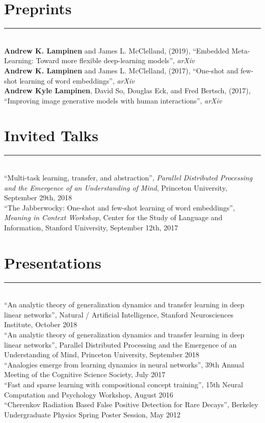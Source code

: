 \documentclass[margin]{res}
\begin{document}
\begin{resume}
\vspace{1pt}\section{Preprints} \vspace{-15pt} \rule{\textwidth}{0.5pt} \\[3pt]
\textbf{Andrew K. Lampinen} and James L. McClelland, (2019), {``Embedded Meta-Learning: Toward more flexible deep-learning models''}, \textit{arXiv} \\ [3pt] 
\textbf{Andrew K. Lampinen} and James L. McClelland, (2017), {``One-shot and few-shot learning of word embeddings''}, \textit{arXiv} \\ [3pt] 
\textbf{Andrew Kyle Lampinen}, David So, Douglas Eck, and Fred Bertsch, (2017), {``Improving image generative models with human interactions''}, \textit{arXiv} 

\vspace{1pt}\section{Invited Talks} \vspace{-15pt} \rule{\textwidth}{0.5pt} \\[3pt]
{``Multi-task learning, transfer, and abstraction''}, \textit{Parallel Distributed Processing and the Emergence of an Understanding of Mind}, Princeton University, September 29th, 2018\\[3pt] 
{``The Jabberwocky: One-shot and few-shot learning of word embeddings''}, \textit{Meaning in Context Workshop}, Center for the Study of Language and Information,  Stanford University, September 12th, 2017 
 
\vspace{1pt}\section{Presentations} \vspace{-15pt} \rule{\textwidth}{0.5pt} \\[3pt]
{``An analytic theory of generalization dynamics and transfer learning in deep linear networks''}, Natural / Artificial Intelligence, Stanford Neurosciences Institute, October 2018\\[3pt]
{``An analytic theory of generalization dynamics and transfer learning in deep linear networks''}, Parallel Distributed Processing and the Emergence of an Understanding of Mind, Princeton University, September 2018\\[3pt]
{``Analogies emerge from learning dynamics in neural networks''}, 39th Annual Meeting of the Cognitive Science Society, July 2017\\[3pt]
{``Fast and sparse learning with compositional concept training''}, 15th Neural Computation and Psychology Workshop, August 2016\\[3pt]
{``Cherenkov Radiation Based False Positive Detection for Rare Decays''}, Berkeley Undergraduate Physics Spring Poster Session, May 2012


\end{resume}
\end{document}
